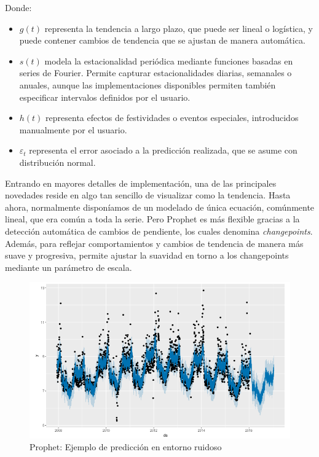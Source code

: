 Donde:

\begin{itemize}
    \item \( g(t) \) representa la {tendencia a largo plazo}, que puede ser lineal o logística, y puede contener cambios de tendencia que se ajustan de manera automática.
    \item \( s(t) \) modela la {estacionalidad} periódica mediante funciones basadas en series de Fourier. Permite capturar estacionalidades diarias, semanales o anuales, aunque las implementaciones disponibles permiten también especificar intervalos definidos por el usuario.
    \item \( h(t) \) representa efectos de festividades o eventos especiales, introducidos manualmente por el usuario.
    \item \( \varepsilon_t \) representa el error asociado a la predicción realizada, que se asume con distribución normal.
\end{itemize}

Entrando en mayores detalles de implementación, una de las principales novedades reside en algo tan sencillo de visualizar como la tendencia. Hasta ahora, normalmente disponíamos de un modelado de única ecuación, comúnmente lineal, que era común a toda la serie. Pero Prophet es más flexible gracias a la detección automática de cambios de pendiente, los cuales denomina \textit{changepoints}. Además, para reflejar comportamientos y cambios de tendencia de manera más suave y progresiva, permite ajustar la suavidad en torno a los changepoints mediante un parámetro de escala.

\begin{figure}[H] %
    \centering
    \includegraphics[scale=0.375]{img/prophetex}
    \caption{Prophet: Ejemplo de predicción en entorno ruidoso  \cite{prophet2017}}
    \label{prophetex}
\end{figure}


